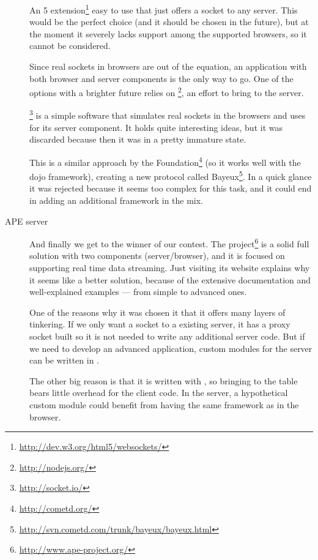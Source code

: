 \begin{description}
  \item[ ] An 5 extension\footnote{\url{http://dev.w3.org/html5/websockets/}} easy to use that just offers a socket to any server.
  This would be the perfect choice (and it should be chosen in the future), but at the moment it severely lacks support among the supported browsers, so it cannot be considered.
  \item[] Since real sockets in browsers are out of the equation, an application with both browser and server components is the only way to go.
  One of the options with a brighter future relies on \footnote{\url{http://nodejs.org/}}, an effort to bring  to the server.
  
  \footnote{\url{http://socket.io/}} is a simple software that simulates real sockets in the browsers and uses  for its server component.
  It holds quite interesting ideas, but it was discarded because then it was in a pretty immature state.
  \item[] This is a similar approach by the  Foundation\footnote{\url{http://cometd.org/}} (so it works well with the dojo framework), creating a new protocol called Bayeux\footnote{\url{http://svn.cometd.com/trunk/bayeux/bayeux.html}}.
  In a quick glance it was rejected because it seems too complex for this task, and it could end in adding an additional framework in the mix.
  \item[\ac{APE} server] And finally we get to the winner of our contest.
  The  project\footnote{\url{http://www.ape-project.org/}} is a solid full solution with two components (server/browser), and it is focused on supporting real time data streaming.
  Just visiting its website explains why it seems like a better solution, because of the extensive documentation and well-explained examples --- from simple to advanced ones.
  
  One of the reasons why it was chosen it that it offers many layers of tinkering.
  If we only want a socket to a existing server, it has a proxy socket built so it is not needed to write any additional server code.
  But if we need to develop an advanced application, custom modules for the server can be written in .
  
  The other big reason is that it is written with , so bringing  to the table bears little overhead for the client code.
  In the server, a hypothetical custom module could benefit from having the same framework as in the browser.
\end{description}

